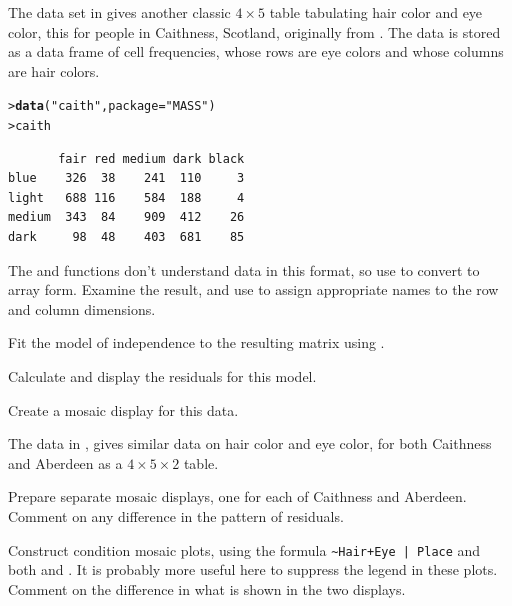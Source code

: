\documentclass[10pt,krantz2]{krantz}\usepackage[]{graphicx}\usepackage[]{color}
\makeatletter
\newcommand{\hlstr}[1]{\textcolor[rgb]{0.192,0.494,0.8}{#1}}%
\newcommand{\hlstd}[1]{\textcolor[rgb]{0.345,0.345,0.345}{#1}}%
\newcommand{\hlkwc}[1]{\textcolor[rgb]{0.333,0.667,0.333}{#1}}%
\newcommand{\hlkwd}[1]{\textcolor[rgb]{0.737,0.353,0.396}{\textbf{#1}}}%
\newenvironment{kframe}{%
 \def\at@end@of@kframe{}%
 \ifinner\ifhmode%
  \def\at@end@of@kframe{\end{minipage}}%
  \begin{minipage}{\columnwidth}%
 \fi\fi%
 \def\FrameCommand##1{\hskip\@totalleftmargin \hskip-\fboxsep
 \colorbox{shadecolor}{##1}\hskip-\fboxsep
     \hskip-\linewidth \hskip-\@totalleftmargin \hskip\columnwidth}%
 \MakeFramed {\advance\hsize-\width
   \@totalleftmargin\z@ \linewidth\hsize
   \@setminipage}}%
 {\par\unskip\endMakeFramed%
 \at@end@of@kframe}
\newenvironment{knitrout}{}{} %
\renewenvironment{knitrout}{\small\renewcommand{\baselinestretch}{.85}}{} %
\makeatother
\begin{document}
\begin{Exercises}
  \exercise The data set  in  gives another
  classic $4 \times 5$ table 
  tabulating hair color and eye color, this for  
  people in Caithness, Scotland, originally from
  \citet{Fisher:1940}.  The data is stored as a data frame of cell frequencies, whose rows are eye colors
  and whose columns are hair colors.
\begin{knitrout}
\color{fgcolor}\begin{kframe}
\begin{alltt}
\hlstd{> }\hlkwd{data}\hlstd{(}\hlstr{"caith"}\hlstd{,} \hlkwc{package}\hlstd{=}\hlstr{"MASS"}\hlstd{)}
\hlstd{> }\hlstd{caith}
\end{alltt}
\begin{verbatim}
       fair red medium dark black
blue    326  38    241  110     3
light   688 116    584  188     4
medium  343  84    909  412    26
dark     98  48    403  681    85
\end{verbatim}
\end{kframe}
\end{knitrout}

  \begin{enumerate*}
    \item The  and  functions don't understand data in this format, 
    so use  
    to convert to array form.  Examine the result, and use  to
    assign appropriate names to the row and column dimensions.
    \item Fit the model of independence to the resulting matrix using .
    \item Calculate and display the residuals for this model.
    \item Create a mosaic display for this data.
  \end{enumerate*}
  

  \exercise The  data in , gives similar data on hair color and eye color, for both
  Caithness and Aberdeen as a $4 \times 5 \times 2$ table.
  \begin{enumerate*}
    \item Prepare separate mosaic displays, one for each of Caithness and Aberdeen.  Comment on any difference in
    the pattern of residuals.
    \item Construct condition mosaic plots, using the formula \verb/~Hair+Eye | Place/ and both  and
    . It is probably more useful here to suppress the legend in these plots.  Comment on the
    difference in what is shown in the two displays.
  \end{enumerate*}
  


\end{Exercises}
\end{document}
